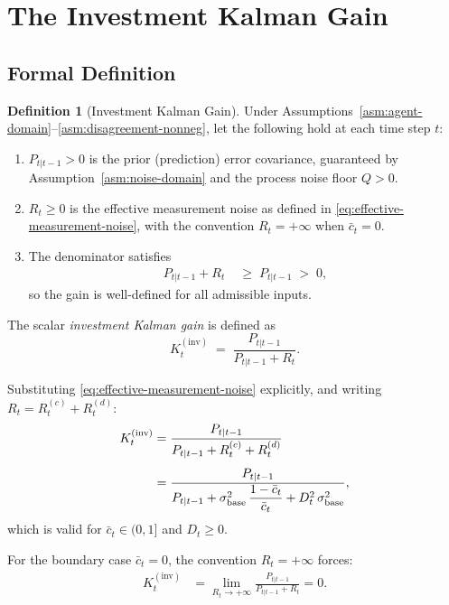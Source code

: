 \documentclass[12pt,openany]{book}
\numberwithin{equation}{chapter}
\theoremstyle{plain}
\theoremstyle{definition}
\newtheorem{definition}[theorem]{Definition}
\theoremstyle{remark}
\begin{document}
\section{The Investment Kalman Gain}
\label{sec:investment-kalman-gain}

\subsection{Formal Definition}

\begin{definition}[Investment Kalman Gain]
\label{def:investment-kalman-gain}
Under Assumptions~\ref{asm:agent-domain}--\ref{asm:disagreement-nonneg},
let the following hold at each time step $t$:
\begin{enumerate}
  \item $P_{t|t-1} > 0$ is the prior (prediction) error covariance,
        guaranteed by Assumption~\ref{asm:noise-domain} and the
        process noise floor $Q > 0$.
  \item $R_t \geq 0$ is the effective measurement noise as defined
        in \eqref{eq:effective-measurement-noise}, with the
        convention $R_t = +\infty$ when $\bar{c}_t = 0$.
  \item The denominator satisfies
        \begin{align}
          P_{t|t-1} + R_t
          &\;\geq\; P_{t|t-1}
          \;>\; 0,
          \label{eq:gain-denom-positive}
        \end{align}
        so the gain is well-defined for all admissible inputs.
\end{enumerate}

The scalar \emph{investment Kalman gain} is defined as
\begin{equation}
  K_t^{(\mathrm{inv})}
  \;=\; \frac{P_{t|t-1}}{P_{t|t-1} + R_t}.
  \label{eq:investment-gain}
\end{equation}

Substituting \eqref{eq:effective-measurement-noise} explicitly,
and writing $R_t = R_t^{(c)} + R_t^{(d)}$:
\begin{align}
  K_t^{(\mathrm{inv})}
  &= \frac{P_{t|t-1}}{%
      P_{t|t-1}
      + R_t^{(c)}
      + R_t^{(d)}}
  \label{eq:gain-split} \\[4pt]
  &= \frac{P_{t|t-1}}{%
      P_{t|t-1}
      + \sigma_{\mathrm{base}}^2\,
        \dfrac{1 - \bar{c}_t}{\bar{c}_t}
      + D_t^2\,\sigma_{\mathrm{base}}^2},
  \label{eq:investment-gain-expanded}
\end{align}
which is valid for $\bar{c}_t \in (0,1]$ and $D_t \geq 0$.

For the boundary case $\bar{c}_t = 0$, the convention
$R_t = +\infty$ forces:
\begin{align}
  K_t^{(\mathrm{inv})}
  &= \lim_{R_t \to +\infty}
     \frac{P_{t|t-1}}{P_{t|t-1} + R_t}
   = 0.
  \label{eq:gain-zero-confidence}
\end{align}
\end{definition}
\end{document}
